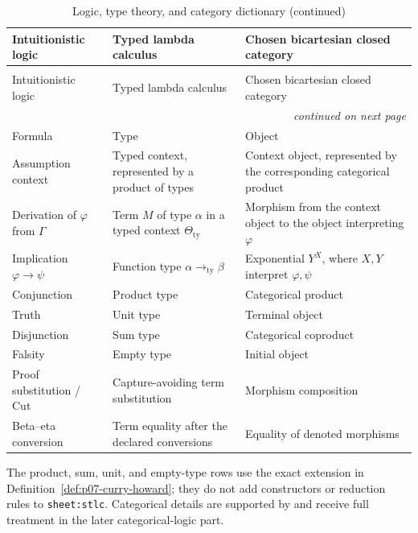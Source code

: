 \begingroup\small
\begin{longtable}{@{}p{}p{}p{}@{}}
\caption{Logic, type theory, and category dictionary.}
\label{tab:p07-curry-howard}\\
\toprule
Intuitionistic logic & Typed lambda calculus & Chosen bicartesian closed
category \\
\midrule
\endfirsthead
\caption[]{Logic, type theory, and category dictionary (continued)}\\
\toprule
Intuitionistic logic & Typed lambda calculus & Chosen bicartesian closed
category \\
\midrule
\endhead
\midrule\multicolumn{3}{r}{\emph{continued on next page}}\\
\endfoot
\endlastfoot
Formula & Type & Object \\
Assumption context & Typed context, represented by a product of types &
Context object, represented by the corresponding categorical product \\
Derivation of \(\varphi\) from \(\Gamma\) & Term \(M\) of type \(\alpha\)
in a typed context \(\Theta_{\mathrm{ty}}\) & Morphism from the context object
to the object interpreting \(\varphi\) \\
Implication \(\varphi\to\psi\) & Function type
\(\alpha\mathbin{\to_{\mathrm{ty}}}\beta\) & Exponential \(Y^X\), where
\(X,Y\) interpret \(\varphi,\psi\) \\
Conjunction & Product type & Categorical product \\
Truth & Unit type & Terminal object \\
Disjunction & Sum type & Categorical coproduct \\
Falsity & Empty type & Initial object \\
Proof substitution / Cut & Capture-avoiding term substitution & Morphism
composition \\
Beta--eta conversion & Term equality after the declared conversions &
Equality of denoted morphisms \\
\bottomrule
\end{longtable}
\endgroup

The product, sum, unit, and empty-type rows use the exact extension in
Definition~\ref{def:p07-curry-howard}; they do not add constructors or
reduction rules to \texttt{sheet:stlc}.  Categorical details are supported by
\cite{GirardLafontTaylor1989,LambekScott1986} and receive full treatment in
the later categorical-logic part.

